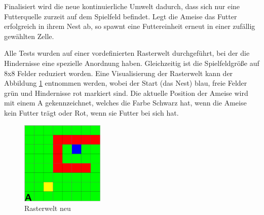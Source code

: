 \par 
Finalisiert wird die neue kontinuierliche Umwelt dadurch, dass sich nur eine Futterquelle zurzeit auf dem Spielfeld befindet. Legt die Ameise das Futter erfolgreich in ihrem Nest ab, so spawnt eine Futtereinheit erneut in einer zufällig gewählten Zelle.
\par 
Alle Tests wurden auf einer vordefinierten Rasterwelt durchgeführt, bei der die Hindernisse eine spezielle Anordnung haben. Gleichzeitig ist die Spielfeldgröße auf 8x8 Felder reduziert worden. Eine Visualisierung der Rasterwelt  kann der Abbildung \ref{fig:rasterweltNeu} entnommen werden, wobei der Start (das Nest) blau, freie Felder grün und Hindernisse rot markiert sind. Die aktuelle Position der Ameise wird mit einem \glqq A\grqq{} gekennzeichnet, welches die Farbe Schwarz hat, wenn die Ameise kein Futter trägt oder Rot, wenn sie Futter bei sich hat.
\begin{figure}[H]
    \begin{center}
    \includegraphics[width=150px]{images/rasterwelt_neu.png}  \end{center}
    \caption{Rasterwelt neu}
    \label{fig:rasterweltNeu}
  \end{figure}

